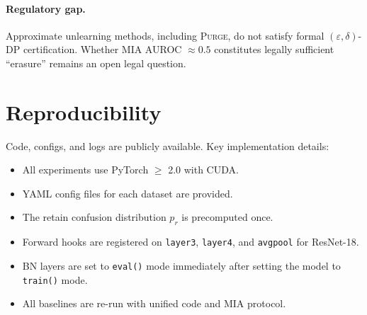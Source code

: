 \documentclass[letterpaper]{article}
\newcommand{\ours}{\textsc{Purge}}
\begin{document}
\paragraph{Regulatory gap.}
Approximate unlearning methods, including \ours{}, do not satisfy formal $(\varepsilon, \delta)$-DP certification. Whether MIA AUROC $\approx 0.5$ constitutes legally sufficient ``erasure'' remains an open legal question.

\section{Reproducibility}

Code, configs, and logs are publicly available. Key implementation details:
\begin{itemize}[nosep]
    \item All experiments use PyTorch $\geq$ 2.0 with CUDA.
    \item YAML config files for each dataset are provided.
    \item The retain confusion distribution $p_r$ is precomputed once.
    \item Forward hooks are registered on \texttt{layer3}, \texttt{layer4}, and \texttt{avgpool} for ResNet-18.
    \item BN layers are set to \texttt{eval()} mode immediately after setting the model to \texttt{train()} mode.
    \item All baselines are re-run with unified code and MIA protocol.
\end{itemize}


\end{document}
